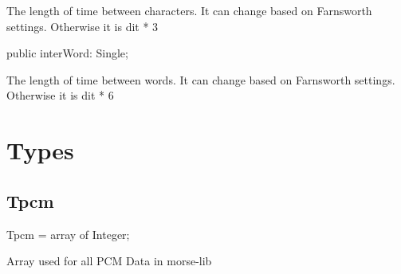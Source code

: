 \documentclass{report}
\newif\ifpdf
\begin{document}
\begin{list}{}
\begin{flushleft}
\ifpdf
\end{flushleft}
\fi


\par The length of time between characters. It can change based on Farnsworth settings. Otherwise it is dit * 3\label{morse.base.TElementTimings-interWord}
\item[\textbf{interWord}\hfill]
\ifpdf
\begin{flushleft}
\fi
\begin{ttfamily}
public interWord: Single;\end{ttfamily}

\ifpdf
\end{flushleft}
\fi


\par The length of time between words. It can change based on Farnsworth settings. Otherwise it is dit * 6\end{list}
\section{Types}
\ifpdf
\subsection*{\large{\textbf{Tpcm}}\normalsize\hspace{1ex}\hrulefill}
\else
\subsection*{Tpcm}
\fi
\label{morse.base-Tpcm}
\begin{list}{}{
\setlength{\itemindent}{0cm}
\setlength{\listparindent}{0cm}
\setlength{\leftmargin}{\evensidemargin}
\addtolength{\leftmargin}{\tmplength}
\settowidth{\labelsep}{X}
\addtolength{\leftmargin}{\labelsep}
\setlength{\labelwidth}{\tmplength}
}
\item[\textbf{Declaration}\hfill]
\ifpdf
\begin{flushleft}
\fi
\begin{ttfamily}
Tpcm = array of Integer;\end{ttfamily}

\ifpdf
\end{flushleft}
\fi

\par
\item[\textbf{Description}]
Array used for all PCM Data in morse{-}lib

\end{list}
\ifpdf
\end{document}
